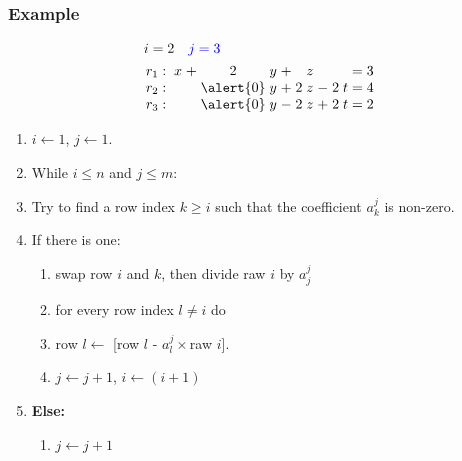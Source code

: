 \documentclass{beamer}
\begin{document}
\begin{frame}
  \frametitle{Example}
  
  \[\arraycolsep=1.4pt
  \begin{aligned}
    &i = 2 \quad {\color{blue}j = 3} \\
      &
    \begin{array}{lcccccccccccccc}
        r_1  & : &  & x & + & 2 & y & + &  & z &  & & & = & 3\\
        r_2 & : &   &   &  &  \alert{0} & y & + & 2 & z & - & 2 & t  & = & 4\\
        r_3  & : &  &   &  & \alert{0}  & y  & - & 2 & z & + & 2 & t & = & 2\\
    \end{array}
  \end{aligned}
  \]
  
  
  \begin{enumerate}
  \item $i \leftarrow 1$, $j \leftarrow 1$.
  \item While $i \le n$ and $j \le m$:
  \item Try to find a row index $k \ge i$ such that the coefficient $a^j_k$ is non-zero.
  \item If there is one:
    \begin{enumerate}
    \item swap row $i$ and $k$, then divide raw $i$ by $a^{j}_j$
    \item for every row index $l \neq i$ do 
    \item row $l \leftarrow$ [row $l$ - $a^j_l\times$raw $i$].
    \item $j \leftarrow j+1$, $i \leftarrow (i+1)$
    \end{enumerate}
  \item {\bf Else:}
    \begin{enumerate}
    \item $j \leftarrow j+1$
    \end{enumerate}
  \end{enumerate}
  
\end{frame}
\end{document}

